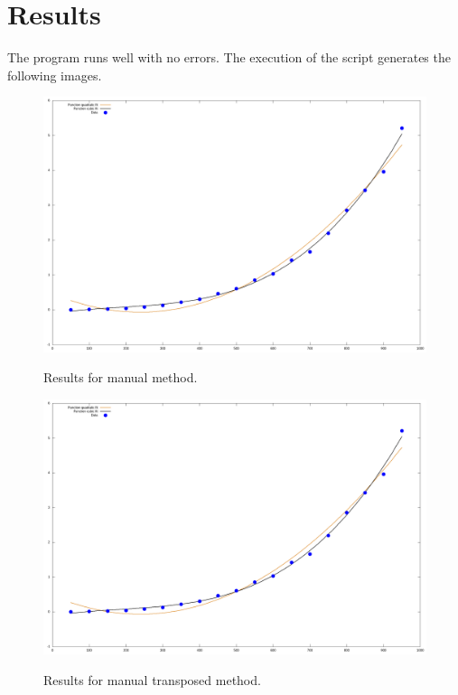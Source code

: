 \documentclass[12pt, a4paper, notitlepage]{report}
\begin{document}
\section*{Results}
The program runs well with no errors. The execution of the script generates the following images.

\begin{figure}[H]
	\centering
	{\includegraphics[scale=0.3]{Fit_m.png}} 
	\caption{Results for manual method.}
	\label{figure_lambdas}
\end{figure}

\begin{figure}[H]
	\centering
	{\includegraphics[scale=0.3]{Fit_T.png}} 
	\caption{Results for manual transposed method.}
	\label{figure_lambdas}
\end{figure}
\end{document}
